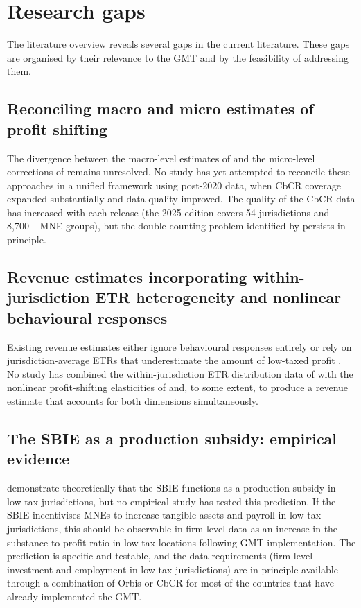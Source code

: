 \documentclass[11pt,a4paper]{article}
\begin{document}
\section{Research gaps}\label{sec:gaps}

The literature overview reveals several gaps in the current literature. These gaps are organised by their relevance to the GMT and by the feasibility of addressing them.

\subsection{Reconciling macro and micro estimates of profit shifting}

The divergence between the macro-level estimates of \citet{torslov2022} and the micro-level corrections of \citet{blouin2023} remains unresolved. No study has yet attempted to reconcile these approaches in a unified framework using post-2020 data, when CbCR coverage expanded substantially and data quality improved. The quality of the CbCR data has increased with each release (the 2025 edition covers 54 jurisdictions and 8,700+ MNE groups), but the double-counting problem identified by \citeauthor{blouin2023} persists in principle. 

\subsection{Revenue estimates incorporating within-jurisdiction ETR heterogeneity and nonlinear behavioural responses}

Existing revenue estimates either ignore behavioural responses entirely \citep{barake2022} or rely on jurisdiction-average ETRs that underestimate the amount of low-taxed profit \citep{hugger2025}. No study has combined the within-jurisdiction ETR distribution data of \citeauthor{hugger2025} with the nonlinear profit-shifting elasticities of \citet{dowd2017} and, to some extent, \citet{garcia2022} to produce a revenue estimate that accounts for both dimensions simultaneously. 

\subsection{The SBIE as a production subsidy: empirical evidence}

\citet{schjelderup2024} demonstrate theoretically that the SBIE functions as a production subsidy in low-tax jurisdictions, but no empirical study has tested this prediction. If the SBIE incentivises MNEs to increase tangible assets and payroll in low-tax jurisdictions, this should be observable in firm-level data as an increase in the substance-to-profit ratio in low-tax locations following GMT implementation. The prediction is specific and testable, and the data requirements (firm-level investment and employment in low-tax jurisdictions) are in principle available through  a combination of Orbis or CbCR for most of the countries that have already implemented the GMT. 
\end{document}
